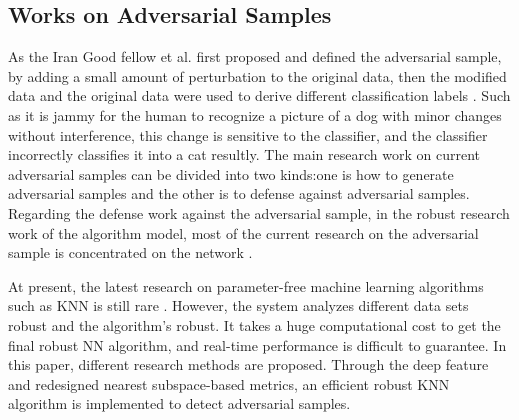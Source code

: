 \documentclass{ieeeaccess}
\begin{document}
\subsection{Works on Adversarial Samples}	
As the Iran Good fellow et al. first proposed and defined the adversarial sample, by adding a small amount of perturbation to the original data, then the modified data and the original data were used to derive different classification labels \cite{goodfellow2014explaining}. Such as it is jammy for the human to recognize a picture of a dog with minor changes without interference, this change is sensitive to the classifier, and the classifier incorrectly classifies it into a cat resultly. The main research work on current adversarial samples can be divided into two kinds:one is how to generate adversarial samples and the other is to defense against adversarial samples. Regarding the defense work against the adversarial sample, in the robust research work of the algorithm model, most of the current research on the adversarial sample is concentrated on the network \cite{wang2017analyzing}. 

At present, the latest research on parameter-free machine learning algorithms such as KNN is still rare \cite{zugner2018adversarial} \cite{wang2017analyzing}. However, the system analyzes different data sets robust and the algorithm's robust. It takes a huge computational cost to get the final robust NN algorithm, and real-time performance is difficult to guarantee. In this paper, different research methods are proposed. Through the deep feature and redesigned nearest subspace-based metrics, an efficient robust KNN algorithm is implemented to detect adversarial samples.

\end{document}
